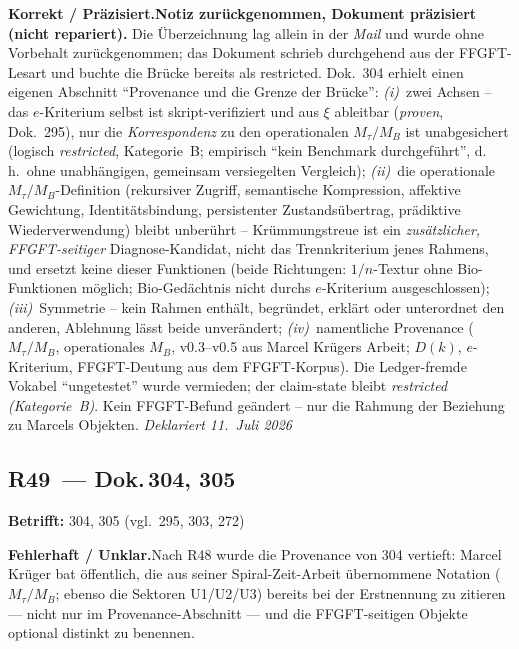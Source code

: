 \smallskip\noindent\textbf{Korrekt / Präzisiert.}\quad \textbf{Notiz zurückgenommen, Dokument präzisiert (nicht repariert).} Die Überzeichnung lag allein in der \emph{Mail} und wurde ohne Vorbehalt zurückgenommen; das Dokument schrieb durchgehend aus der FFGFT-Lesart und buchte die Brücke bereits als restricted. Dok.~304 erhielt einen eigenen Abschnitt \enquote{Provenance und die Grenze der Brücke}: \emph{(i)}~zwei Achsen -- das $e$-Kriterium selbst ist skript-verifiziert und aus $\xi$ ableitbar (\emph{proven}, Dok.~295), nur die \emph{Korrespondenz} zu den operationalen $M_\tau/M_B$ ist unabgesichert (logisch \emph{restricted}, Kategorie~B; empirisch \enquote{kein Benchmark durchgeführt}, d.\,h.\ ohne unabhängigen, gemeinsam versiegelten Vergleich); \emph{(ii)}~die operationale $M_\tau/M_B$-Definition (rekursiver Zugriff, semantische Kompression, affektive Gewichtung, Identitätsbindung, persistenter Zustandsübertrag, prädiktive Wiederverwendung) bleibt unberührt -- Krümmungstreue ist ein \emph{zusätzlicher, FFGFT-seitiger} Diagnose-Kandidat, nicht das Trennkriterium jenes Rahmens, und ersetzt keine dieser Funktionen (beide Richtungen: $1/n$-Textur ohne Bio-Funktionen möglich; Bio-Gedächtnis nicht durchs $e$-Kriterium ausgeschlossen); \emph{(iii)}~Symmetrie -- kein Rahmen enthält, begründet, erklärt oder unterordnet den anderen, Ablehnung lässt beide unverändert; \emph{(iv)}~namentliche Provenance ($M_\tau/M_B$, operationales $M_B$, v0.3--v0.5 aus Marcel Krügers Arbeit; $D(k)$, $e$-Kriterium, FFGFT-Deutung aus dem FFGFT-Korpus). Die Ledger-fremde Vokabel \enquote{ungetestet} wurde vermieden; der claim-state bleibt \emph{restricted (Kategorie~B)}. Kein FFGFT-Befund geändert -- nur die Rahmung der Beziehung zu Marcels Objekten. \emph{Deklariert 11.~Juli 2026}


\medskip


\subsection*{R49~--- Dok.\,304, 305}

\noindent\textbf{Betrifft:} 304, 305 (vgl.\ 295, 303, 272)


\smallskip\noindent\textbf{Fehlerhaft / Unklar.}\quad Nach R48 wurde die Provenance von 304 vertieft: Marcel Krüger bat öffentlich, die aus seiner Spiral-Zeit-Arbeit übernommene Notation ($M_\tau/M_B$; ebenso die Sektoren U1/U2/U3) bereits bei der Erstnennung zu zitieren --- nicht nur im Provenance-Abschnitt --- und die FFGFT-seitigen Objekte optional distinkt zu benennen.


